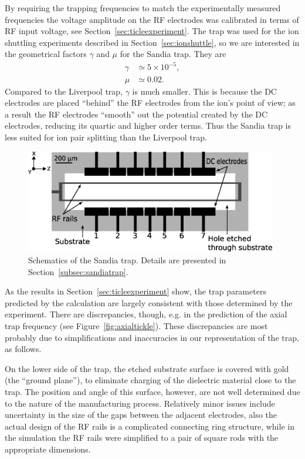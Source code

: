 By requiring the trapping frequencies to match the experimentally measured frequencies the voltage amplitude on the RF electrodes was calibrated in terms of RF input voltage, see Section~\ref{sec:ticleexperiment}. The trap was used for the ion shuttling experiments described in Section~\ref{sec:ionshuttle}, so we are interested in the geometrical factors $\gamma$ and $\mu$ for the Sandia trap. They are
\begin{align}
\gamma & \simeq 5 \times 10^{-5}, \\
\mu & \simeq 0.02.
\end{align}
Compared to the Liverpool trap, $\gamma$ is much smaller. This is because the DC electrodes are placed ``behind'' the RF electrodes from the ion's point of view; as a result the RF electrodes ``smooth'' out the potential created by the DC electrodes, reducing its quartic and higher order terms. Thus the Sandia trap is less suited for ion pair splitting than the Liverpool trap.
 


\begin{figure}[t]
\centering
\includegraphics[width=11cm]{chapter4/sandia/trapscheme1d_v3}
\caption[Sandia trap schematics]{Schematics of the Sandia trap. Details are presented in Section~\ref{subsec:sandiatrap}.}
\label{fig:sandiatrap1}
\end{figure} 



As the results in Section~\ref{sec:ticleexperiment} show, the trap parameters predicted by the calculation are largely consistent with those determined by the experiment. There are discrepancies, though, e.g. in the prediction of the axial trap frequency (see Figure~\ref{fig:axialtickle}). These discrepancies are most probably due to simplifications and inaccuracies in our representation of the trap, as follows.

On the lower side of the trap, the etched substrate surface is covered with gold (the ``ground plane''), to eliminate charging of the dielectric material close to the trap. The position and angle of this surface, however, are not well determined due to the nature of the manufacturing process. Relatively minor issues include uncertainty in the size of the gaps between the adjacent electrodes, also the actual design of the RF rails is a complicated connecting ring structure, while in the simulation the RF rails were simplified to a pair of square rods with the appropriate dimensions.

